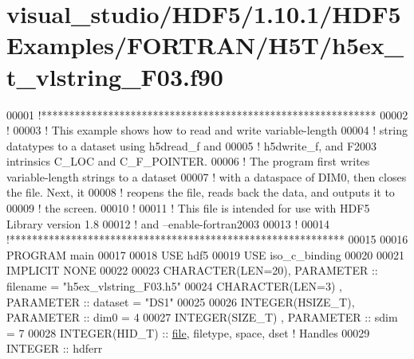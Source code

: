\hypertarget{visual__studio_2_h_d_f5_21_810_81_2_h_d_f5_examples_2_f_o_r_t_r_a_n_2_h5_t_2h5ex__t__vlstring___f03_8f90_source}{}\section{visual\+\_\+studio/\+H\+D\+F5/1.10.1/\+H\+D\+F5\+Examples/\+F\+O\+R\+T\+R\+A\+N/\+H5\+T/h5ex\+\_\+t\+\_\+vlstring\+\_\+\+F03.f90}
\label{visual__studio_2_h_d_f5_21_810_81_2_h_d_f5_examples_2_f_o_r_t_r_a_n_2_h5_t_2h5ex__t__vlstring___f03_8f90_source}

\begin{DoxyCode}
00001 \textcolor{comment}{!************************************************************}
00002 \textcolor{comment}{!}
00003 \textcolor{comment}{!  This example shows how to read and write variable-length}
00004 \textcolor{comment}{!  string datatypes to a dataset using h5dread\_f and}
00005 \textcolor{comment}{!  h5dwrite\_f, and F2003 intrinsics C\_LOC and C\_F\_POINTER.  }
00006 \textcolor{comment}{!  The program first writes variable-length strings to a dataset }
00007 \textcolor{comment}{!  with a dataspace of DIM0, then closes the file.  Next, it }
00008 \textcolor{comment}{!  reopens the file, reads back the data, and outputs it to }
00009 \textcolor{comment}{!  the screen.}
00010 \textcolor{comment}{!}
00011 \textcolor{comment}{!  This file is intended for use with HDF5 Library version 1.8}
00012 \textcolor{comment}{!  and --enable-fortran2003}
00013 \textcolor{comment}{!}
00014 \textcolor{comment}{!************************************************************}
00015 
00016 \textcolor{keyword}{PROGRAM} main
00017 
00018   \textcolor{keywordtype}{USE }hdf5
00019   \textcolor{keywordtype}{USE }iso\_c\_binding
00020   
00021   \textcolor{keywordtype}{IMPLICIT NONE}
00022 
00023   \textcolor{keywordtype}{CHARACTER(LEN=20)}, \textcolor{keywordtype}{PARAMETER} :: filename = \textcolor{stringliteral}{"h5ex\_vlstring\_F03.h5"}
00024   \textcolor{keywordtype}{CHARACTER(LEN=3)} , \textcolor{keywordtype}{PARAMETER} :: dataset  = \textcolor{stringliteral}{"DS1"}
00025 
00026   \textcolor{keywordtype}{INTEGER(HSIZE\_T)}, \textcolor{keywordtype}{PARAMETER} :: dim0 = 4
00027   \textcolor{keywordtype}{INTEGER(SIZE\_T)} , \textcolor{keywordtype}{PARAMETER} :: sdim = 7
00028   \textcolor{keywordtype}{INTEGER(HID\_T)}  :: \hyperlink{structfile}{file}, filetype, space, dset \textcolor{comment}{! Handles}
00029   \textcolor{keywordtype}{INTEGER} :: hdferr

\end{DoxyCode}
